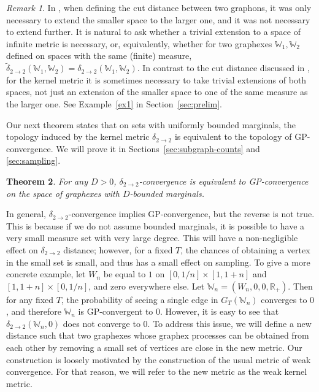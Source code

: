 \documentclass{amsart}
\numberwithin{equation}{section}
\numberwithin{figure}{section}
\newtheorem{theorem}{Theorem}[section]
\theoremstyle{definition}
\theoremstyle{remark}
\newtheorem{remark}[theorem]{Remark}
\newcommand{\RR}{\mathbb{R}}
\newcommand{\cW}{\mathbb{W}}
\newcommand{\deltt}{\delta_{2\to 2}}
\def\tdel22{{\widetilde{\delta}}_{2\to 2}}
\begin{document}
\begin{remark}
In \cite{BCCH16}, when defining the cut distance between two graphons, it was
only necessary to extend the smaller space to the larger one, and it was not
necessary to extend further. It is natural to ask whether a trivial extension
to a space of infinite metric is necessary, or, equivalently, whether for two
graphexes $\cW_1,\cW_2$ defined on spaces with the same (finite) measure,
$\tdel22(\cW_1,\cW_2)=\deltt(\cW_1,\cW_2)$. In contrast to the cut distance
discussed in \cite{BCCH16}, for the kernel metric it is sometimes necessary
to take trivial extensions of both spaces, not just an extension of the
smaller space to one of the same measure as the larger one. See
Example~\ref{ex1} in Section~\ref{sec:prelim}.
\end{remark}

Our next theorem states that on sets with uniformly bounded marginals, the
topology induced by the kernel metric $\deltt$ is equivalent to the topology
of GP-convergence. We will prove it in Sections~\ref{sec:subgraph-counts} and
\ref{sec:sampling}.

\begin{theorem}
\label{thm:deltt-GP} For any $D>0$, $\deltt$-convergence is equivalent to
GP-convergence on the space of graphexes with $D$-bounded marginals.
\end{theorem}

In general, $\deltt$-convergence implies GP-convergence, but the reverse is
not true. This is because if we do not assume bounded marginals, it is
possible to have a very small measure set with very large degree. This will
have a non-negligible effect on $\deltt$ distance; however, for a fixed $T$,
the chances of obtaining a vertex in the small set is small, and thus has a
small effect on sampling. To give a more concrete example, let $W_n$ be equal
to $1$ on $[0,1/n] \times [1,1+n]$ and $[1,1+n] \times [0,1/n]$, and zero
everywhere else. Let $\cW_n=(W_n,0,0,\RR_+)$. Then for any fixed $T$, the
probability of seeing a single edge in $G_T(\cW_n)$ converges to $0$, and
therefore $\cW_n$ is GP-convergent to $0$. However, it is easy to see that
$\deltt(\cW_n,0)$ does not converge to $0$. To address this issue, we will
define a new distance such that two graphexes whose graphex processes can be
obtained from each other by removing a small set of vertices are close in the
new metric. Our construction is loosely motivated by the construction of the
usual metric of weak convergence. For that reason, we will refer to the new
metric as the weak kernel metric.
\end{document}
